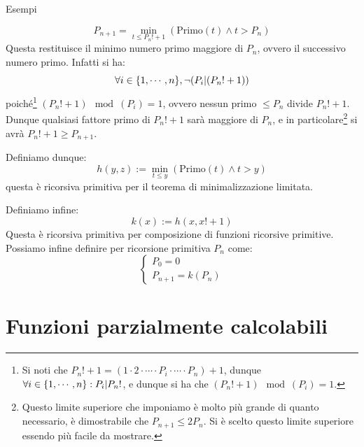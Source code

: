 \begin{generalbox}[colframe=azure-gradient-3!90!black]{Esempi}
\begin{enumerate}
\begin{itemize}
\begin{equation}
        P_{n+1}=\min_{t\leq P_{n}!+1}(\text{Primo}(t) \land t>P_n)
      \end{equation}
      Questa restituisce il minimo numero primo maggiore di \(P_n\), ovvero il successivo numero primo. Infatti si ha:
      \begin{equation}
        \forall i\in\displaystyle{\left\{{1,\cdots,n}\right\}}, \neg(P_i|(P_n!+1))
      \end{equation}
      poiché\footnote{Si noti che \(P_n!+1=(1\cdot 2 \cdot \cdots \cdot P_i \cdot \cdots \cdot P_n)+1\), dunque \(\forall i\in\displaystyle{\left\{{1,\cdots,n}\right\}}: P_i|P_n!\), e dunque si ha che \((P_n!+1)\mod (P_i)=1\).}   \((P_n!+1)\mod (P_i)=1\), ovvero nessun primo \(\leq P_n\) divide \(P_n!+1\). Dunque qualsiasi fattore primo di \(P_n!+1\) sarà maggiore di \(P_n\), e in particolare\footnote{Questo limite superiore che imponiamo è molto più grande di quanto necessario, è dimostrabile che \(P_{n+1}\leq2P_n\). Si è scelto questo limite superiore essendo più facile da mostrare.}   si avrà \(P_n!+1\geq P_{n+1}\). %

      Definiamo dunque:
      \begin{equation}
        h(y,z) := \min_{t\leq y}(\text{Primo}(t) \land t>y)
      \end{equation}
      questa è ricorsiva primitiva per il teorema di minimalizzazione limitata.

      Definiamo infine:
      \begin{equation}
        k(x):= h(x, x!+1)
      \end{equation}
      Questa è ricorsiva primitiva per composizione di funzioni ricorsive primitive. Possiamo infine definire per ricorsione primitiva \(P_n\) come:
      \begin{equation}
         \begin{cases}
            P_0=0\\
            P_{n+1}=k(P_n)
          \end{cases}
      \end{equation}
    \end{itemize}
  \end{enumerate}
\end{generalbox}

\newpage

\section{Funzioni parzialmente calcolabili}

